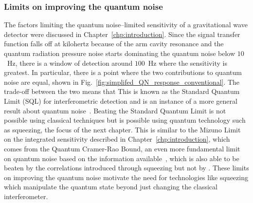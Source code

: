 
\subsubsection{Limits on improving the quantum noise}

The factors limiting the quantum noise--limited sensitivity of a gravitational wave detector were discussed in Chapter~\ref{chp:introduction}. Since the signal transfer function falls off at kilohertz because of the arm cavity resonance and the quantum radiation pressure noise starts dominating the quantum noise below $10$~Hz, there is a window of detection around $100$~Hz where the sensitivity is greatest. In particular, there is a point where the two contributions to quantum noise are equal, shown in Fig.~\ref{fig:simplifed_QN_response_conventional}. The trade-off between the two  means that 
This is known as the Standard Quantum Limit (SQL) for interferometric detection and is an instance of a more general result about quantum noise~\cite{}. Beating the Standard Quantum Limit is not possible using classical techniques but is possible using quantum technology such as squeezing, the focus of the next chapter. This is similar to the Mizuno Limit on the integrated sensitivity described in Chapter~\ref{chp:introduction}, which comes from the Quantum Cramer-Rao Bound, an even more fundamental limit on quantum noise based on the information available~\cite{}, which is also able to be beaten by the correlations introduced through squeezing but not by .
These limits on improving the quantum noise motivate the need for technologies like squeezing which manipulate the quantum state beyond just changing the classical interferometer.



